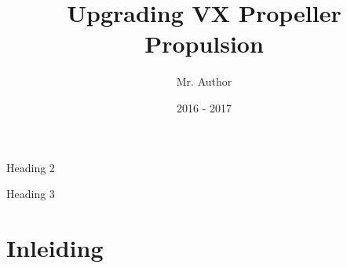 \documentclass[11pt, a4paper, oneside]{article}
\title{Upgrading VX Propeller Propulsion}
\author{Mr. Author}
\date{2016 - 2017}
\newcommand{\subtitle}{Heading 2}
\newcommand{\subsubtitle}{Heading 3}
\begin{document}

	\begin{titlepage}

				 \AddToShipoutPicture*{\BackgroundPic}

				\vspace*{130mm}

				\begin{flushright}
				\bf
				\color{oranjerood}
				{
					\scshape	
					\huge
					\selectfont
					\thetitle
				}

				\vspace{0mm}
				\LARGE
				\subtitle
				\end{flushright}
				\vspace{\fill}
				{\color{blauwgroen} \subsubtitle}

				\newpage

	\end{titlepage}


\tableofcontents

\newpage



\chapter{Inleiding}
\end{document}
